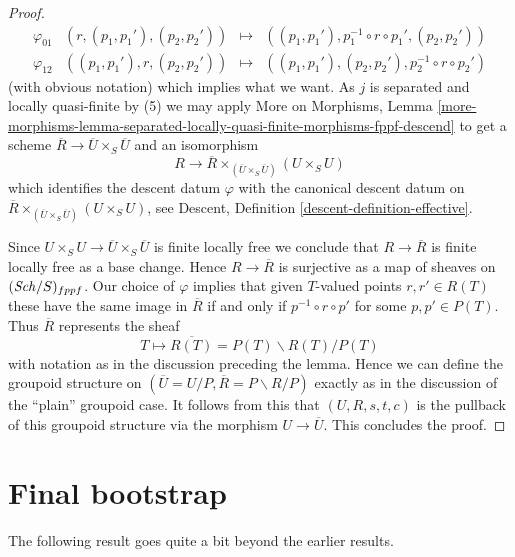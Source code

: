\begin{proof}
$$\begin{matrix}
\varphi_{01} & (r, (p_1, p_1'), (p_2, p_2')) & \mapsto &
((p_1, p_1'), p_1^{-1} \circ r \circ p_1', (p_2, p_2')) \\
\varphi_{12} & ((p_1, p_1'), r, (p_2, p_2')) & \mapsto &
((p_1, p_1'), (p_2, p_2'), p_2^{-1} \circ r \circ p_2')
\end{matrix}
$$
(with obvious notation) which implies what we want.
As $j$ is separated and locally quasi-finite by (5) we may apply
More on Morphisms, Lemma
\ref{more-morphisms-lemma-separated-locally-quasi-finite-morphisms-fppf-descend}
to get a scheme $\overline{R} \to \overline{U} \times_S \overline{U}$
and an isomorphism
$$
R \to \overline{R} \times_{(\overline{U} \times_S \overline{U})} (U \times_S U)
$$
which identifies the descent datum $\varphi$ with the canonical
descent datum on
$\overline{R} \times_{(\overline{U} \times_S \overline{U})} (U \times_S U)$,
see
Descent, Definition \ref{descent-definition-effective}.

\medskip\noindent
Since $U \times_S U \to \overline{U} \times_S \overline{U}$ is finite
locally free we conclude that $R \to \overline{R}$ is finite locally free
as a base change. Hence $R \to \overline{R}$ is surjective as a map of
sheaves on $(\mathit{Sch}/S)_{fppf}$.
Our choice of $\varphi$ implies that given $T$-valued points $r, r' \in R(T)$
these have the same image in $\overline{R}$ if and only if
$p^{-1} \circ r \circ p'$ for some $p, p' \in P(T)$. Thus
$\overline{R}$ represents the sheaf
$$
T \longmapsto  \overline{R(T)} = P(T)\backslash R(T)/P(T)
$$
with notation as in the discussion preceding the lemma.
Hence we can define the groupoid structure on
$(\overline{U} = U/P, \overline{R} = P\backslash R/P)$ exactly as in
the discussion of the ``plain'' groupoid case.
It follows from this that $(U, R, s, t, c)$ is the pullback of
this groupoid structure via the morphism $U \to \overline{U}$.
This concludes the proof.
\end{proof}















\section{Final bootstrap}
\label{section-final-bootstrap}

\noindent
The following result goes quite a bit beyond the earlier results.

